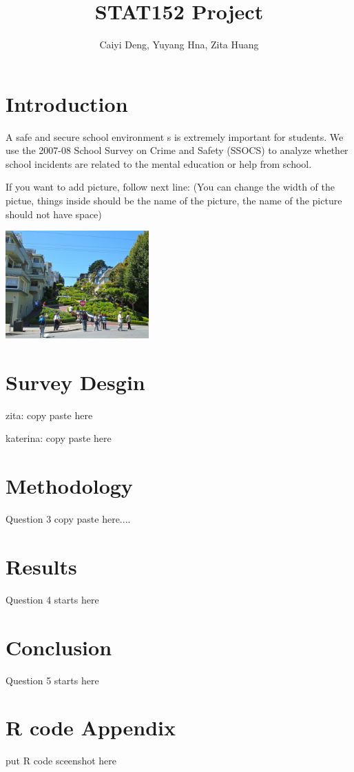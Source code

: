 \documentclass[11pt]{article}
\title{STAT152 Project}
\author {Caiyi Deng, Yuyang Hna, Zita Huang}
\begin{document}


\maketitle

\section{Introduction}

\vspace{0.2cm}

A safe and secure school environment s is extremely important for students.
We use the 2007-08 School Survey on Crime and Safety (SSOCS) to analyze whether school incidents are related to the mental education or help from school. 

If you want to add picture, follow next line: (You can change the width of the pictue, things inside {} should be the name of the picture, the name of the picture should not have space)

\includegraphics[width = 5.5cm]{RussianHill.jpg}


\section{Survey Desgin}

\vspace{0.2cm}

zita: copy paste here

katerina: copy paste here

\section{Methodology}

\vspace{0.2cm}

Question 3 copy paste here....


\section{Results}

\vspace{0.2cm}

Question 4 starts here

\section{Conclusion}

\vspace{0.2cm}

Question 5 starts here

\section{R code Appendix}

\vspace{0.2cm}

put R code sceenshot here 
\end{document}

